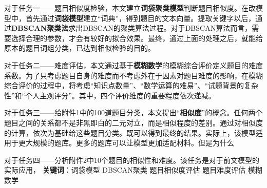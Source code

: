 对于任务一——题目相似度检验，本文建立\textbf{词袋聚类模型}判断题目相似度。在改模型中，首先通过\textbf{词袋模型}建立“词典”，得到题目的文本向量。提取关键字以后，通过\textbf{DBSCAN聚类法}求出DBSCAN的聚类算法过程。对于DBSCAN算法而言，需要选择合理的参数，才会有较好的拟合效果。最终，通过上面的处理之后，就能给原本的题目词组分类，已达到相似检验的目的。

对于任务二——难度评估，本文通过基于\textbf{模糊数学}的模糊综合评价定义题目的难度系数。为了只考虑题目自身的难度而不考虑外在于因素对题目难度的影响，在模糊综合评价的过程中，将考虑“知识点数量”、“数学运算的难易”、“试题背景的复杂性”和“个人主观评分”。其中，四个评价维度的重要程度依次递减。

对于任务三——给附件1中的100道题目分类，本文提出“\textbf{相似度}”的概念。任何两个题目之间的关系都不是非黑即白的二元对立，而是相似程度的差别。通过对相似度的计算，依次为基础给这些题目分类。既可以得到最终的结果。实际上，该模型适用于更大规模的题库。更多的题库可以让模型更加适配材料。但是为什么

对于任务四——分析附件2中10个题目的相似性和难度。该任务是对于前文模型的实际应用，
\newline
\newline
\textbf{关键词}：词袋模型 \quad DBSCAN聚类 \quad 题目相似度评估 \quad 题目难度评估 \quad 模糊数学

\newpage
\thispagestyle{empty}
\tableofcontents